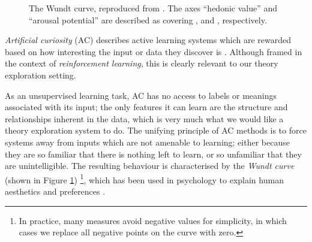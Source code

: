 \begin{figure}
  \centering

  \caption{The Wundt curve, reproduced from \citep{berlyne1970novelty}. The axes ``hedonic value'' and ``arousal potential'' are described as covering , and , respectively.}

  \label{fig:wundt}
\end{figure}

\emph{Artificial curiosity} (AC) describes active learning systems which are rewarded based on how interesting the input or data they discover is \citep{schmidhuber2006developmental}. Although framed in the context of \emph{reinforcement learning}, this is clearly relevant to our theory exploration setting.

As an unsupervised learning task, AC has no access to labels or meanings associated with its input; the only features it can learn are the structure and relationships inherent in the data, which is very much what we would like a theory exploration system to do. The unifying principle of AC methods is to force systems away from inputs which are not amenable to learning; either because they are so familiar that there is nothing left to learn, or so unfamiliar that they are unintelligible. The resulting behaviour is characterised by the \emph{Wundt curve} (shown in Figure \ref{fig:wundt}) \footnote{In practice, many measures avoid negative values for simplicity, in which cases we replace all negative points on the curve with zero.}, which has been used in psychology to explain human aesthetics and preferences \citep{berlyne1970novelty}.


